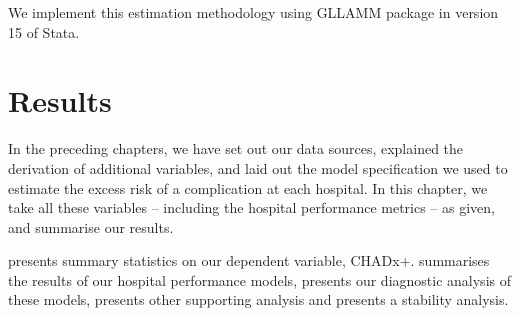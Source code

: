 \documentclass[submission]{grattan}
\begin{document}
We implement this estimation methodology using \citeauthor{Stata-multilevel-modelling} GLLAMM package in version 15 of Stata.




\chapter{Results}\label{chap:results}

In the preceding chapters, we have set out our data sources, explained the derivation of additional variables, and laid out the model specification we used to estimate the excess risk of a complication at each hospital.
In this chapter, we take all these variables -- including the hospital performance metrics -- as given, and summarise our results.

 presents summary statistics on our dependent variable, CHADx+.  summarises the results of our hospital performance models,  presents our diagnostic analysis of these models,  presents other supporting analysis and  presents a stability analysis.
\end{document}

